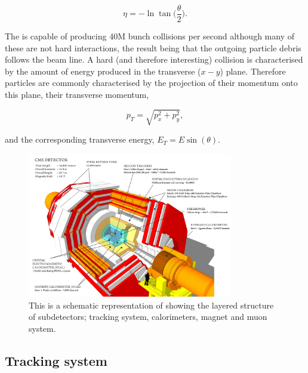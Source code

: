 \begin{equation}
	\eta = -\ln\tan\biggl(\frac{\theta}{2}\biggr).
\end{equation}

The \LHC is capable of producing 40M bunch collisions per second although many of these are not hard interactions, the result being that the outgoing particle debris follows the beam line. A hard (and therefore interesting) collision is characterised by the amount of energy produced in the transverse ($x-y$) plane. Therefore particles are commonly characterised by the projection of their momentum onto this plane, their transverse momentum,

\begin{equation}
	p_{T} = \sqrt{p_{x}^{2}+p_{y}^{2}},
\end{equation}

and the corresponding transverse energy, $E_{T} = E\sin(\theta)$.

\begin{figure}
  \includegraphics[width=0.8\textwidth]{cms_experiment/plots/cms_diagram.png}
  \caption[CMS diagram]{This is a schematic representation of \CMS showing the layered structure of subdetectors; tracking system, calorimeters, magnet and muon system.}
  \label{fig:cms_diagram}
\end{figure}

\subsection{Tracking system}
\label{sec:tracker}

